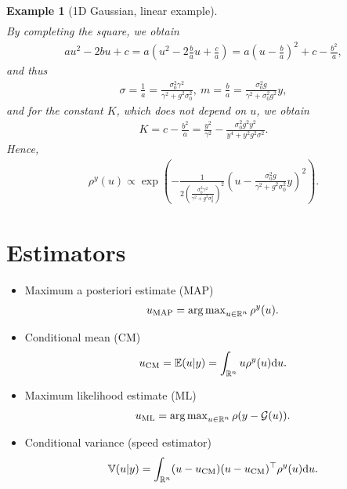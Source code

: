 \documentclass[oneside,11pt]{book}
\numberwithin{equation}{section}
\newtheorem{example}{Example}[section]
\begin{document}
\begin{example}[1D Gaussian, linear example]
\begin{align*}
    \end{align*}
    By completing the square, we obtain
    \begin{align*}
        au^2 - 2bu + c = a\left(u^2 - 2\frac{b}{a}u + \frac{c}{a}\right) = a\left(u - \frac{b}{a}\right)^2 + c - \frac{b^2}{a},
    \end{align*}
    and thus
    \begin{align*}
        \sigma = \frac{1}{a} = \frac{\sigma_0^2\gamma^2}{\gamma^2 + g^2\sigma_0^2},\ m = \frac{b}{a} = \frac{\sigma_0^2g}{\gamma^2 + \sigma_0^2g^2}y,
    \end{align*}
    and for the constant $K$, which does not depend on $u$, we obtain
    \begin{align*}
        K = c - \frac{b^2}{a} = \frac{y^2}{\gamma^2} - \frac{\sigma_0^2g^2y^2}{y^4 + y^2g^2\sigma^2}.
    \end{align*}
    Hence,
    \begin{align*}
        \rho^y(u)\propto\exp\left(-\frac{1}{2\left(\frac{\sigma_0^2\gamma^2}{\gamma^2 + g^2\sigma_0^2}\right)^2}\left(u - \frac{\sigma_0^2g}{\gamma^2 + g^2\sigma_0^2}y\right)^2\right).
    \end{align*}
\end{example}

\section{Estimators}
\begin{itemize}
    \item Maximum a posteriori estimate (MAP)
    \begin{align*}
        u_{\rm MAP} = \operatorname{arg\max}_{u\in\mathbb{R}^n} \rho^y(u).
    \end{align*}
    \item Conditional mean (CM)
    \begin{align*}
        u_{\rm CM} = \mathbb{E}(u|y) = \int_{\mathbb{R}^n} u\rho^y(u){\rm d}u.
    \end{align*}
    \item Maximum likelihood estimate (ML)
    \begin{align*}
        u_{\rm ML} = \operatorname{arg\max}_{u\in\mathbb{R}^n} \rho(y - \mathcal{G}(u)).
    \end{align*}
    \item Conditional variance (speed estimator)
    \begin{align*}
        \mathbb{V}(u|y) = \int_{\mathbb{R}^n} (u - u_{\rm CM})(u - u_{\rm CM})^\top\rho^y(u){\rm d}u.
    \end{align*}
\end{itemize}
\end{document}
